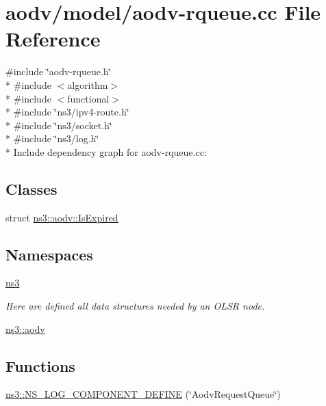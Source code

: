 \hypertarget{aodv-rqueue_8cc}{}\section{aodv/model/aodv-\/rqueue.cc File Reference}
\label{aodv-rqueue_8cc}
{\ttfamily \#include \char`\"{}aodv-\/rqueue.\+h\char`\"{}}\\*
{\ttfamily \#include $<$algorithm$>$}\\*
{\ttfamily \#include $<$functional$>$}\\*
{\ttfamily \#include \char`\"{}ns3/ipv4-\/route.\+h\char`\"{}}\\*
{\ttfamily \#include \char`\"{}ns3/socket.\+h\char`\"{}}\\*
{\ttfamily \#include \char`\"{}ns3/log.\+h\char`\"{}}\\*
Include dependency graph for aodv-\/rqueue.cc\+:
\subsection*{Classes}
\begin{DoxyCompactItemize}
\item 
struct \hyperlink{structns3_1_1aodv_1_1IsExpired}{ns3\+::aodv\+::\+Is\+Expired}
\end{DoxyCompactItemize}
\subsection*{Namespaces}
\begin{DoxyCompactItemize}
\item 
 \hyperlink{namespacens3}{ns3}
\begin{DoxyCompactList}\small\item\em Here are defined all data structures needed by an O\+L\+SR node. \end{DoxyCompactList}\item 
 \hyperlink{namespacens3_1_1aodv}{ns3\+::aodv}
\end{DoxyCompactItemize}
\subsection*{Functions}
\begin{DoxyCompactItemize}
\item 
\hyperlink{namespacens3_a8d705f72e40ce227d1221c09ad2c76c4}{ns3\+::\+N\+S\+\_\+\+L\+O\+G\+\_\+\+C\+O\+M\+P\+O\+N\+E\+N\+T\+\_\+\+D\+E\+F\+I\+NE} (\char`\"{}Aodv\+Request\+Queue\char`\"{})
\end{DoxyCompactItemize}

